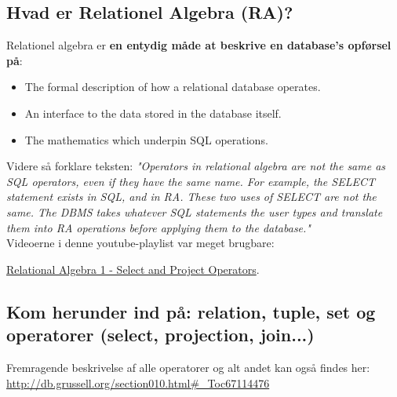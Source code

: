 \newpage

\subsection{Hvad er Relationel Algebra (RA)?}


Relationel algebra er \textbf{en entydig måde at beskrive en database's opførsel på}: 

\begin{itemize}
	\item The formal description of how a relational database operates.
	\item An interface to the data stored in the database itself.
	\item The mathematics which underpin SQL operations.
\end{itemize}

Videre så forklare teksten: \textit{"Operators in relational algebra are not the same as SQL operators, even if they have the same name. For example, the SELECT statement exists in SQL, and in RA. These two uses of SELECT are not the same. The DBMS takes whatever SQL statements the user types and translate them into RA operations before applying them to the database."}\\

Videoerne i denne youtube-playlist var meget brugbare:

\href{https://www.youtube.com/watch?v=yVh_LcOcQdg&list=PL8A52AA7E276200C0&index=1}{Relational Algebra 1 - Select and Project Operators}.

\subsection{Kom herunder ind på: relation, tuple, set og operatorer (select, projection, join...)}

Fremragende beskrivelse af alle operatorer og alt andet kan også findes her: \\
\url{http://db.grussell.org/section010.html#_Toc67114476}


